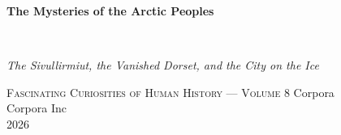 \clearpage
\vspace*{1.5in}
\begin{center}
  \begin{minipage}{\textwidth}
    \centering
    \Huge\bfseries
    \linespread{1.25}\selectfont
    The Mysteries of the Arctic Peoples
  \end{minipage}
  \\[3em]
  {\Large\itshape\linespread{1.3}\selectfont
  The Sivullirmiut, the Vanished Dorset, and the City on the Ice\par}
  \vspace{2em}
  {\small\scshape Fascinating Curiosities of Human History — Volume 8}
  \vfill
  {\large Corpora}
  \\[1em]
  {\large Corpora Inc}
  \\[1em]
  {\large 2026}
\end{center}
\clearpage
